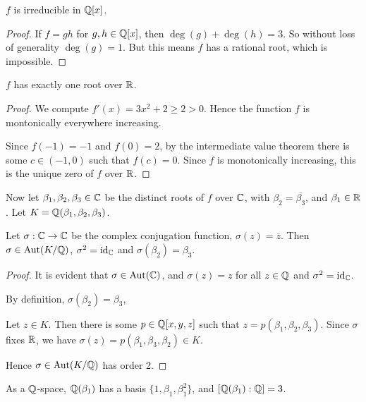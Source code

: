 \documentclass{unswmaths}
\begin{document}
\begin{lemma}
    $f$ is irreducible in $\mathbb{Q}[x]$.
\end{lemma}
\begin{proof}
    If $f = gh$ for $g,h\in \mathbb{Q}[x]$, then $\deg(g)+\deg(h) = 3$.
    So without loss of generality $\deg(g) = 1$. But this means
    $f$ has a rational root, which is impossible.    
\end{proof}
\begin{lemma}
    $f$ has exactly one root over $\mathbb{R}$.
\end{lemma}
\begin{proof}
    We compute $f'(x) = 3x^2+2 \geq 2 > 0$. Hence 
    the function $f$ is montonically everywhere increasing.
    
    Since $f(-1) = -1$ and $f(0) = 2$, by the intermediate value
    theorem there is some $c \in (-1,0)$ such that $f(c) = 0$.
    Since $f$ is monotonically increasing, this is the unique
    zero of $f$ over $\mathbb{R}$.
\end{proof}
Now let $\beta_1,\beta_2,\beta_3 \in \mathbb{C}$ be the distinct
roots of $f$ over $\mathbb{C}$, with $\beta_2 = \overline{\beta_3}$,
and $\beta_1 \in \mathbb{R}$. Let $K = \mathbb{Q}(\beta_1,\beta_2,\beta_3)$.
\begin{lemma}
    Let $\sigma:\mathbb{C}\rightarrow \mathbb{C}$ be the complex
    conjugation function, $\sigma(z) = \overline{z}$. Then
    $\sigma \in \operatorname{Aut}(K/\mathbb{Q})$, $\sigma^2 = \operatorname{id}_{\mathbb{C}}$
    and $\sigma(\beta_2) = \beta_3$.
\end{lemma}
\begin{proof}
    It is evident that $\sigma \in \operatorname{Aut}(\mathbb{C})$,
    and $\sigma(z) = z$
    for all $z \in \mathbb{Q}$ and $\sigma^2 = \operatorname{id}_{\mathbb{C}}$.
    
    By definition, $\sigma(\beta_2) = \beta_3$,
    
    Let $z \in K$. Then there is some $p \in \mathbb{Q}[x,y,z]$
    such that $z = p(\beta_1,\beta_2,\beta_3)$.
    Since $\sigma$ fixes $\mathbb{R}$,
    we have $\sigma(z) = p(\beta_1,\beta_3,\beta_2) \in K$.  
    
    Hence $\sigma \in \operatorname{Aut}(K/\mathbb{Q})$ has order 2.
\end{proof}
\begin{lemma}
    As a $\mathbb{Q}$-space, $\mathbb{Q}(\beta_1)$ has a basis $\{1,\beta_1,\beta_1^2\}$,
    and $[\mathbb{Q}(\beta_1):\mathbb{Q}] = 3$.
\end{lemma}
\end{document}
